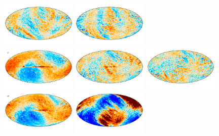 \documentclass[twocolumn]{../../common/aa}
\begin{document}
\begin{figure}
        \includegraphics[width=0.32\textwidth]{figures/megadiff_Q_Q.pdf}
        \includegraphics[width=0.32\textwidth]{figures/megadiff_Q_U.pdf}\\\vspace*{-4mm}
	\includegraphics[width=0.32\textwidth]{figures/megadiff_V_I.pdf}
        \includegraphics[width=0.32\textwidth]{figures/megadiff_V_Q.pdf}
        \includegraphics[width=0.32\textwidth]{figures/megadiff_V_U.pdf}\\\vspace*{-4mm}
	\includegraphics[width=0.32\textwidth]{figures/megadiff_W_I.pdf}
        \includegraphics[width=0.32\textwidth]{figures/megadiff_W_Q.pdf}

\end{figure}
\end{document}
